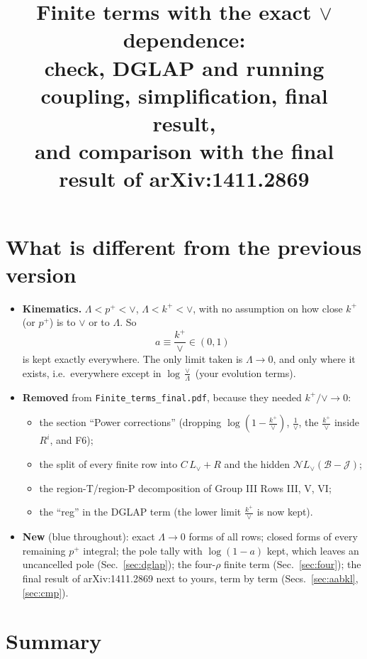 \documentclass[10pt]{article}
\title{Finite terms with the exact $\vee$ dependence:\\ check, DGLAP and running coupling, simplification, final result,\\ and comparison with the final result of arXiv:1411.2869}
\date{}
\numberwithin{equation}{section}
\newcommand{\old}[1]{{\color{red}#1}}
\newcommand{\Lv}{L_{\vee}}
\newcommand{\JJ}{\mathcal J}
\newcommand{\NN}{\mathcal N}
\begin{document}
\maketitle
\tableofcontents

\section{What is different from the previous version}\label{sec:diff}
\begin{itemize}
\item \textbf{Kinematics.} $\Lambda<p^+<\vee$, $\Lambda<k^+<\vee$, with no assumption on how close $k^+$ (or $p^+$) is to $\vee$ or to $\Lambda$. So
\begin{equation*}
a\equiv\frac{k^+}{\vee}\in(0,1)
\end{equation*}
is kept exactly everywhere. The only limit taken is $\Lambda\to0$, and only where it exists, i.e.\ everywhere except in $\log\frac{\vee}{\Lambda}$ (your evolution terms).
\item \textbf{Removed} from \texttt{Finite\_terms\_final.pdf}, because they needed $k^+/\vee\to0$:
\begin{itemize}
\item \old{the section ``Power corrections'' (dropping $\log(1-\frac{k^+}{\vee})$, $\frac{1}{\vee}$, the $\frac{k^+}{\vee}$ inside $R^i$, and F6);}
\item \old{the split of every finite row into $C\,\Lv+R$ and the hidden $\NN\Lv(\mathcal B-\JJ)$;}
\item \old{the region-T/region-P decomposition of Group III Rows III, V, VI;}
\item \old{the ``reg'' in the DGLAP term (the lower limit $\frac{k^+}{\vee}$ is now kept).}
\end{itemize}
\item \textbf{New} (blue throughout): exact $\Lambda\to0$ forms of all rows; closed forms of every remaining $p^+$ integral; the pole tally with $\log(1-a)$ kept, which leaves an uncancelled pole (Sec.~\ref{sec:dglap}); the four-$\rho$ finite term (Sec.~\ref{sec:four}); the final result of arXiv:1411.2869 next to yours, term by term (Secs.~\ref{sec:aabkl}, \ref{sec:cmp}).
\end{itemize}

\section{Summary}\label{sec:summary}
\end{document}

